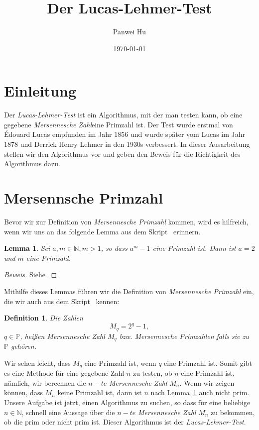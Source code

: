 \documentclass{article}
\title{Der Lucas-Lehmer-Test}
\date{\today}
\author{Panwei Hu}
\newtheorem{lemma}{Lemma}
\newtheorem{definition}{Definition}
\newcommand{\myparaDent}{12pt}
\newcommand{\Nature}{\ensuremath{\mathbb{N}}}
\newcommand{\myMersen}{\emph{Mersennesche Zahl}}
\begin{document}
  \maketitle
  \newpage
	\newpage
  \newpage
\newpage
\section{Einleitung}
Der \emph{Lucas-Lehmer-Test} ist ein Algorithmus, mit der man testen kann, ob eine gegebene
\myMersen eine Primzahl ist. Der Test wurde erstmal von Édouard Lucas empfunden im Jahr 1856 und wurde sp\"{a}ter vom Lucas im Jahr 1878 und Derrick Henry Lehmer in den 1930s verbessert. In dieser Ausarbeitung stellen wir den Algorithmus vor und geben den Beweis f\"{u}r die Richtigkeit des Algorithmus dazu.
\section{Mersennsche Primzahl}
Bevor wir zur Definition von \emph{Mersennesche Primzahl} kommen, wird es
hilfreich, wenn wir uns an das folgende Lemma aus dem Skript~\cite{script} erinnern.
\begin{lemma}\label{lem1}
	Sei $a,m \in \mathbb{N},m > 1$, so dass $a^m - 1$ eine Primzahl ist. Dann ist
	$a = 2$ und $m$ eine Primzahl.
\end{lemma}
\begin{proof}[Beweis]
Siehe \cite{script}
\end{proof}
Mithilfe dieses Lemmas f\"{u}hren wir die Definition von \emph{Mersennesche Primzahl} ein, die wir auch aus dem Skript~\cite{script} kennen:
\begin{definition}
Die Zahlen
\[
	M_{q} = 2^{q} - 1,
\]
$q \in \mathbb{P}$, hei{\ss}en \emph{Mersennesche Zahl} $M_{q}$ bzw. \emph{Mersennesche Primzahlen} falls sie zu $\mathbb{P}$ geh\"{o}ren.
\end{definition}
Wir sehen leicht, dass $M_{q}$ eine Primzahl ist, wenn $q$ eine Primzahl ist.
Somit gibt es eine Methode f\"{u}r eine gegebene Zahl $n$ zu testen, ob $n$ eine Primzahl ist, n\"{a}mlich, wir berechnen die $n-te$ \emph{Mersennesche Zahl} $M_{n}$. Wenn wir zeigen k\"{o}nnen, dass $M_{n}$ keine Primzahl ist, dann ist $n$ nach Lemma~\ref{lem1} auch nicht prim.\\[\myparaDent]
Unsere Aufgabe ist jetzt, einen Algorithmus zu suchen, so dass f\"{u}r eine beliebige $n \in \Nature$, schnell eine Aussage \"{u}ber die $n-te$ \emph{Mersennesche Zahl} $M_{n}$ zu bekommen, ob die prim oder nicht prim ist. Dieser Algorithmus ist der \emph{Lucas-Lehmer-Test}. 
\end{document}
